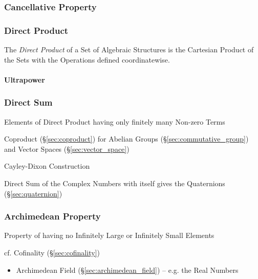 \subsubsection{Cancellative Property}\label{sec:cancellative_property}

\subsubsection{Direct Product}\label{sec:direct_product}

The \emph{Direct Product} of a Set of Algebraic Structures is the Cartesian
Product of the Sets with the Operations defined coordinatewise.



\paragraph{Ultrapower}\label{sec:ultrapower}\hfill



\subsubsection{Direct Sum}\label{sec:direct_sum}

Elements of Direct Product having only finitely many Non-zero Terms

Coproduct (\S\ref{sec:coproduct}) for Abelian Groups
(\S\ref{sec:commutative_group}) and Vector Spaces (\S\ref{sec:vector_space})

Cayley-Dixon Construction

Direct Sum of the Complex Numbers with itself gives the Quaternions
(\S\ref{sec:quaternion})



\subsubsection{Archimedean Property}\label{sec:archimedean_property}

Property of having no Infinitely Large or Infinitely Small Elements

cf. Cofinality (\S\ref{sec:cofinality})

\begin{itemize}
  \item Archimedean Field (\S\ref{sec:archimedean_field}) -- e.g. the Real
    Numbers
\end{itemize}



